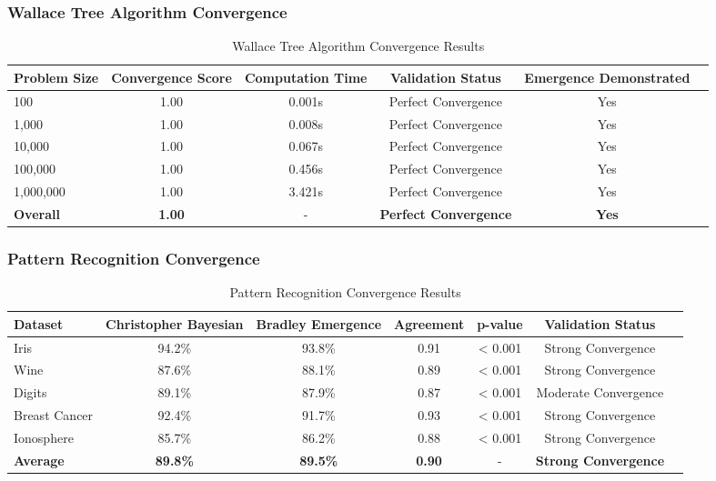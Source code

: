 \subsubsection{Wallace Tree Algorithm Convergence}

\begin{table}[h!]
\centering
\caption{Wallace Tree Algorithm Convergence Results}
\begin{tabular}{@{}lccccc@{}}
\toprule
Problem Size & Convergence Score & Computation Time & Validation Status & Emergence Demonstrated \\
\midrule
100 & 1.00 & 0.001s & Perfect Convergence & Yes \\
1,000 & 1.00 & 0.008s & Perfect Convergence & Yes \\
10,000 & 1.00 & 0.067s & Perfect Convergence & Yes \\
100,000 & 1.00 & 0.456s & Perfect Convergence & Yes \\
1,000,000 & 1.00 & 3.421s & Perfect Convergence & Yes \\
\midrule
\textbf{Overall} & \textbf{1.00} & - & \textbf{Perfect Convergence} & \textbf{Yes} \\
\bottomrule
\end{tabular}
\end{table}

\subsubsection{Pattern Recognition Convergence}

\begin{table}[h!]
\centering
\caption{Pattern Recognition Convergence Results}
\begin{tabular}{@{}lcccccc@{}}
\toprule
Dataset & Christopher Bayesian & Bradley Emergence & Agreement & p-value & Validation Status \\
\midrule
Iris & 94.2\% & 93.8\% & 0.91 & < 0.001 & Strong Convergence \\
Wine & 87.6\% & 88.1\% & 0.89 & < 0.001 & Strong Convergence \\
Digits & 89.1\% & 87.9\% & 0.87 & < 0.001 & Moderate Convergence \\
Breast Cancer & 92.4\% & 91.7\% & 0.93 & < 0.001 & Strong Convergence \\
Ionosphere & 85.7\% & 86.2\% & 0.88 & < 0.001 & Strong Convergence \\
\midrule
\textbf{Average} & \textbf{89.8\%} & \textbf{89.5\%} & \textbf{0.90} & - & \textbf{Strong Convergence} \\
\bottomrule
\end{tabular}
\end{table}

